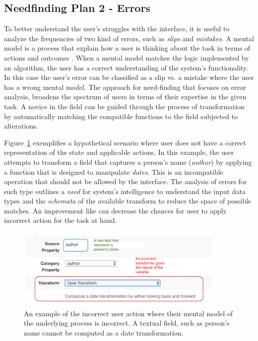 \documentclass[12pt,letterpaper]{article}
\begin{document}
\subsection*{Needfinding Plan 2 - Errors}
To better understand the user's struggles with the interface, it is useful to analyze the frequencies of two kind of errors, such as \textit{slips} and \textit{mistakes}. A mental model is a process that explain how a user is thinking about the task in terms of actions and outcomes \cite{wiki:mental_model}. When a mental model matches the logic implemented by an algorithm, the user has a correct understanding of the system's functionality. In this case the user's error can be classified as a slip vs. a mistake where the user has a wrong mental model. The approach for need-finding that focuses on error analysis, broadens the spectrum of users  in terms of their expertise in the given task. A novice in the field can be guided through the process of transformation by automatically matching the compatible functions to the field subjected to alterations. 

Figure~\ref{fig::5} exemplifies a hypothetical scenario where user does not have a correct representation of the state and applicable actions. In this example, the user attempts to transform a field that captures a person's name (\textit{author}) by applying a function that is designed to manipulate \textit{dates}. This is an incompatible operation that should not be allowed by the interface. The analysis of errors for such type outlines a \textit{need} for system's intelligence to understand the input data types and the \textit{schemata} of the available transform to reduce the space of possible matches. An improvement like can decrease the chances for user to apply incorrect action for the task at hand.   

\begin{figure}[h]
\centering
\includegraphics[width=4in, scale=.3]{mistake.png}
\caption{An example of the incorrect user action where their mental model of the underlying process is incorrect. A textual field, such as person's name cannot be computed as a date transformation.}
\label{fig::5}
\end{figure}
\end{document}
